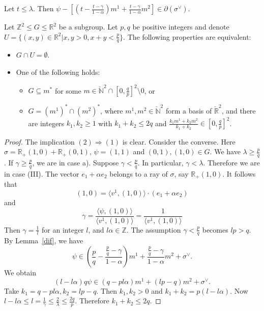 \documentclass[10pt,a4paper]{amsart}
\newcommand{\N}{{\mathbb N}}
\newcommand{\R}{{\mathbb R}}
\newcommand{\Z}{{\mathbb Z}}
\begin{document}
\begin{lem}\label{dif}
Let $t\le \lambda$. Then 
$\psi-[(t-\frac{t-\gamma}{1-\alpha})m^1+ 
\frac{t-\gamma}{1-\alpha}m^2]\in \partial(\sigma^\vee)$.
\end{lem}

\begin{thm}\label{Lawr}
Let $\Z^2\le G\le \R^2$ be a subgroup.
Let $p,q$ be positive integers and denote
$U=\{(x,y)\in \R^2 \vert x,y>0,x+y<\frac{p}{q}\}$. 
The following properties are equivalent:
\begin{itemize}
\item[(1)] $G\cap U=\emptyset$.
\item[(2)] One of the following holds:
\begin{itemize}
\item[a)] $G\subseteq m^*$ for some 
$m\in \check{\N}^2\cap [0,\frac{q}{p}]^2\setminus 0$, or
\item[b)] $G=(m^1)^*\cap(m^2)^*$, where $m^1,m^2\in \check{\N}^2$ form a 
basis of $\check{\R}^2$, and there are integers $k_1,k_2\ge 1$
with $k_1+k_2\le 2q$ and $\frac{k_1m^1+k_2m^2}{k_1+k_2}\in [0,\frac{q}{p}]^2$.
\end{itemize}
\end{itemize}
\end{thm}

\begin{proof}
The implication $(2)\Longrightarrow (1)$ is clear.
Consider the converse. Here $\sigma=\R_+(1,0)+\R_+(0,1)$, 
$\psi=(1,1)$ and $(0,1),(1,0)\in G$.
We have $\lambda\ge \frac{p}{q}$.
If $\gamma\ge \frac{p}{q}$, we are in case a). Suppose 
$\gamma<\frac{p}{q}$. In particular, $\gamma<\lambda$.
Therefore we are in case (III).
The vector $e_1+\alpha e_2$ belongs
to a ray of $\sigma$, say $\R_+(1,0)$. 
It follows that 
$$
(1,0)=\langle v^1,(1,0)\rangle \cdot (e_1+\alpha e_2)
$$
and 
$$
\gamma=\frac{\langle \psi,(1,0)\rangle}{\langle v^1,(1,0)\rangle}=\frac{1}{\langle v^1,(1,0)\rangle}
$$
Then $\gamma=\frac{1}{l}$ for an integer $l$, and $l\alpha\in \Z$. 
The assumption $\gamma<\frac{p}{q}$ becomes $lp>q$. By Lemma~\ref{dif},
we have 
$$
\psi\in (\frac{p}{q}-\frac{\frac{p}{q}-\gamma}{1-\alpha})m^1+
\frac{\frac{p}{q}-\gamma}{1-\alpha} m^2+\sigma^\vee.
$$
We obtain
$$
(l-l\alpha)q\psi\in (q-pl\alpha)m^1+(lp-q)m^2+\sigma^\vee.
$$
Take $k_1=q-pl\alpha,k_2=lp-q$. Then $k_1,k_2>0$ and 
$k_1+k_2=p(l-l\alpha)$. Now $l-l\alpha\le l=\frac{1}{\gamma}
\le \frac{2}{\lambda}\le \frac{2q}{p}$. Therefore
$k_1+k_2\le 2q$. 
\end{proof}
\end{document}
